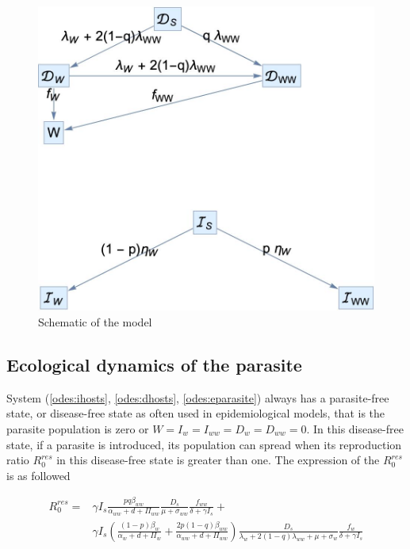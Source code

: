 \documentclass{article}
\begin{document}
\begin{figure}
\includegraphics[width=\textwidth]{Figures/schematic}
\caption{Schematic of the model}
\label{fig:schematic}
\end{figure}

\subsection{Ecological dynamics of the parasite}

System (\ref{odes:ihosts}, \ref{odes:dhosts}, \ref{odes:eparasite}) always has a parasite-free state, or disease-free state as often used in epidemiological models, that is the parasite population is zero or $W = I_w = I_{ww} = D_w = D_{ww} = 0$. In this disease-free state, if a parasite is introduced, its population can spread when its reproduction ratio $R^{res}_0$ in this disease-free state is greater than one. The expression of the $R^{res}_0$ is as followed

\begin{align}
R^{res}_0 = & \gamma I_s \frac{ p q \beta_{ww}}{\alpha_{ww} + d + \Pi_{ww}} \frac{D_s}{\mu +\sigma_{ww}} \frac{f_{ww}}{\delta +\gamma I_s} + \nonumber \\
& \gamma  I_s \left( \frac{ (1-p)\beta_w}{\alpha_w + d + \Pi_w} + \frac{2 p (1-q) \beta_{ww}}{\alpha_{ww} + d + \Pi_{ww}} \right) \frac{D_s}{\lambda_w + 2 (1-q) \lambda_{ww}  + \mu + \sigma_w} \frac{f_w}{\delta +\gamma  I_s}
\end{align}
\end{document}
